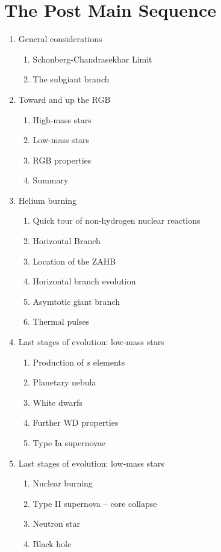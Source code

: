 \documentclass{article}
\begin{document}
\section{The Post Main Sequence}
\begin{enumerate}
    \item General considerations
        \begin{enumerate}
            \item Schonberg-Chandrasekhar Limit
            \item The subgiant branch
        \end{enumerate}
    \item Toward and up the RGB
        \begin{enumerate}
            \item High-mass stars
            \item Low-mass stars
            \item RGB properties
            \item Summary
        \end{enumerate}
    \item Helium burning
        \begin{enumerate}
            \item Quick tour of non-hydrogen nuclear reactions
            \item Horizontal Branch
            \item Location of the ZAHB
            \item Horizontal branch evolution
            \item Asymtotic giant branch
            \item Thermal pulses
        \end{enumerate}
    \item Last stages of evolution: low-mass stars
        \begin{enumerate}
            \item Production of $s$ elements
            \item Planetary nebula
            \item White dwarfs
            \item Further WD properties
            \item Type Ia supernovae
        \end{enumerate}
    \item Last stages of evolution: low-mass stars
        \begin{enumerate}
            \item Nuclear burning
            \item Type II supernova -- core collapse
            \item Neutron star
            \item Black hole
        \end{enumerate}
\end{enumerate}
\end{document}
